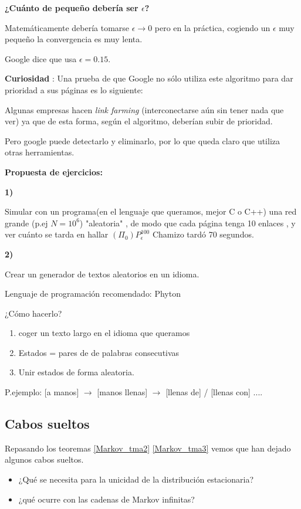 \textbf{¿Cuánto de pequeño debería ser $\epsilon$?}

Matemáticamente debería tomarse $\epsilon\rightarrow 0$ pero en la práctica, cogiendo un $\epsilon$ muy pequeño la convergencia es muy lenta.

Google dice que usa $\epsilon = 0.15$.

\textbf{Curiosidad} : Una prueba de que Google no sólo utiliza este algoritmo para dar prioridad a sus páginas es lo siguiente:

Algunas empresas hacen \textit{link farming} (interconectarse aún sin tener nada que ver) ya que de esta forma, según el algoritmo, deberían subir de prioridad.

\begin{center}


\end{center}

Pero google puede detectarlo y eliminarlo, por lo que queda claro que utiliza otras herramientas.

\textbf{Propuesta de ejercicios:}

\textbf{1)}


	Simular con un programa(en el lenguaje que queramos, mejor C o C++) una red grande (p.ej $N= 10^6$) "aleatoria" , de modo que cada página tenga 10 enlaces , y ver cuánto se tarda en hallar $(\Pi_0) P_{\epsilon}^{100}$
	Chamizo tardó 70 segundos.



\textbf{2)}


	Crear un generador de textos aleatorios en un idioma.

	Lenguaje de programación recomendado: Phyton

	¿Cómo hacerlo?
	\begin{enumerate}
		\item coger un texto largo en el idioma que queramos
		\item Estados = pares de de palabras consecutivas
		\item Unir estados de forma aleatoria.
	\end{enumerate}
	P.ejemplo: [a manos] $\rightarrow$ [manos llenas] $\rightarrow$ [llenas de] / [llenas con] ....

\subsection{Cabos sueltos}
 Repasando los teoremas \ref{Markov_tma2} \ref{Markov_tma3} vemos que han dejado algunos cabos sueltos.
\begin{itemize}
	\item ¿Qué se necesita para la unicidad de la distribución estacionaria?
	\item ¿qué ocurre con las cadenas de Markov infinitas?
\end{itemize}

